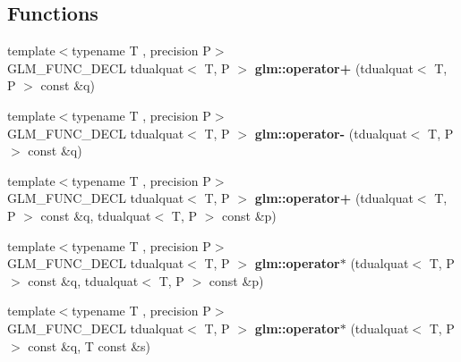 \subsection*{Functions}
\begin{DoxyCompactItemize}
\item 
\hypertarget{group__gtx__dual__quaternion_gaf14cf93205560472618c9f93a52a2e1f}{{\footnotesize template$<$typename T , precision P$>$ }\\G\-L\-M\-\_\-\-F\-U\-N\-C\-\_\-\-D\-E\-C\-L tdualquat$<$ T, P $>$ {\bfseries glm\-::operator+} (tdualquat$<$ T, P $>$ const \&q)}\label{group__gtx__dual__quaternion_gaf14cf93205560472618c9f93a52a2e1f}

\item 
\hypertarget{group__gtx__dual__quaternion_ga90a25279ac4f392a823e8bf6dfaddb9b}{{\footnotesize template$<$typename T , precision P$>$ }\\G\-L\-M\-\_\-\-F\-U\-N\-C\-\_\-\-D\-E\-C\-L tdualquat$<$ T, P $>$ {\bfseries glm\-::operator-\/} (tdualquat$<$ T, P $>$ const \&q)}\label{group__gtx__dual__quaternion_ga90a25279ac4f392a823e8bf6dfaddb9b}

\item 
\hypertarget{group__gtx__dual__quaternion_ga9d7cfca38c6ff90757705600da3c7972}{{\footnotesize template$<$typename T , precision P$>$ }\\G\-L\-M\-\_\-\-F\-U\-N\-C\-\_\-\-D\-E\-C\-L tdualquat$<$ T, P $>$ {\bfseries glm\-::operator+} (tdualquat$<$ T, P $>$ const \&q, tdualquat$<$ T, P $>$ const \&p)}\label{group__gtx__dual__quaternion_ga9d7cfca38c6ff90757705600da3c7972}

\item 
\hypertarget{group__gtx__dual__quaternion_ga2c224f87242fe82e8ebc17f01aa51126}{{\footnotesize template$<$typename T , precision P$>$ }\\G\-L\-M\-\_\-\-F\-U\-N\-C\-\_\-\-D\-E\-C\-L tdualquat$<$ T, P $>$ {\bfseries glm\-::operator$\ast$} (tdualquat$<$ T, P $>$ const \&q, tdualquat$<$ T, P $>$ const \&p)}\label{group__gtx__dual__quaternion_ga2c224f87242fe82e8ebc17f01aa51126}

\item 
\hypertarget{group__gtx__dual__quaternion_ga5251d67271c42cf52227b6254f3fc8ed}{{\footnotesize template$<$typename T , precision P$>$ }\\G\-L\-M\-\_\-\-F\-U\-N\-C\-\_\-\-D\-E\-C\-L tdualquat$<$ T, P $>$ {\bfseries glm\-::operator$\ast$} (tdualquat$<$ T, P $>$ const \&q, T const \&s)}\label{group__gtx__dual__quaternion_ga5251d67271c42cf52227b6254f3fc8ed}


\end{DoxyCompactItemize}
